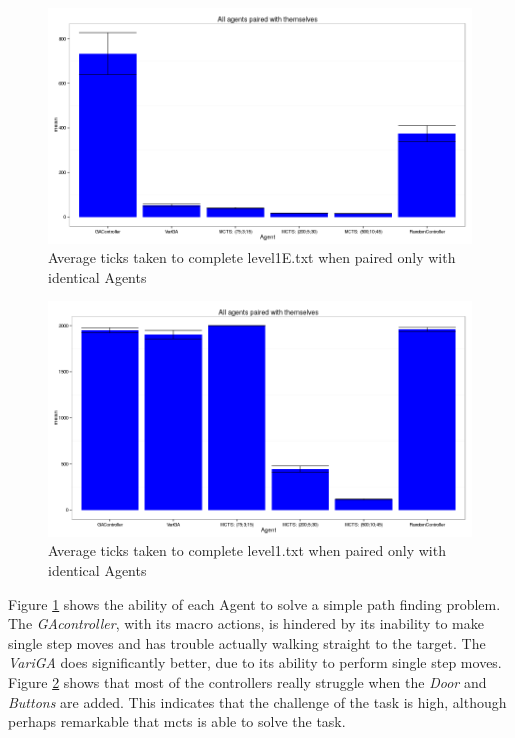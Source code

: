 \documentclass{IEEEtran}
\begin{document}
\begin{figure}[!ht]
\centering
\includegraphics[width=\linewidth]{level1E-txt-pairs-ticks}
\caption{Average ticks taken to complete level1E.txt when paired only with identical Agents}
\label{1epairedTicks}
\end{figure}

\begin{figure}[!ht]
\centering
\includegraphics[width=\linewidth]{level1-txt-pairs-ticks}
\caption{Average ticks taken to complete level1.txt when paired only with identical Agents}
\label{1pairedTicks}
\end{figure}

Figure \ref{1epairedTicks} shows the ability of each Agent to solve a simple path finding problem. The \emph{GAcontroller}, with its macro actions, is hindered by its inability to make single step moves and has trouble actually walking straight to the target. The \emph{VariGA} does significantly better, due to its ability to perform single step moves. Figure \ref{1pairedTicks} shows that most of the controllers really struggle when the \emph{Door} and \emph{Buttons} are added. This indicates that the challenge of the task is high, although perhaps remarkable that \gls{mcts} is able to solve the task.
\end{document}
